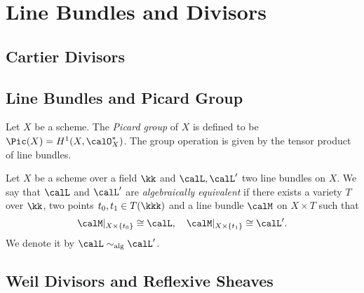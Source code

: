 \section{Line Bundles and Divisors}

\subsection{Cartier Divisors}

\subsection{Line Bundles and Picard Group}

    \begin{definition}\label{def:picard_group}
        Let \(X\) be a scheme. 
        The \emph{Picard group} of \(X\) is defined to be \(\Pic(X) = H^1(X, \calO_X^*)\).
        The group operation is given by the tensor product of line bundles.
    \end{definition}

    \begin{definition}\label{def:algebraically_equivalent_line_bundles}
        Let \(X\) be a scheme over a field \(\kk\) and \(\calL, \calL'\) two line bundles on \(X\).
        We say that \(\calL\) and \(\calL'\) are \emph{algebraically equivalent} if there exists a  variety \(T\) over \(\kk\), two points \(t_0, t_1 \in T(\kkk)\) and a line bundle \(\calM\) on \(X \times T\) such that 
        \[ \calM|_{X \times \{t_0\}} \cong \calL, \quad \calM|_{X \times \{t_1\}} \cong \calL'. \]
        We denote it by \(\calL \sim_{\text{alg}} \calL'\).
    \end{definition}

\subsection{Weil Divisors and Reflexive Sheaves}
